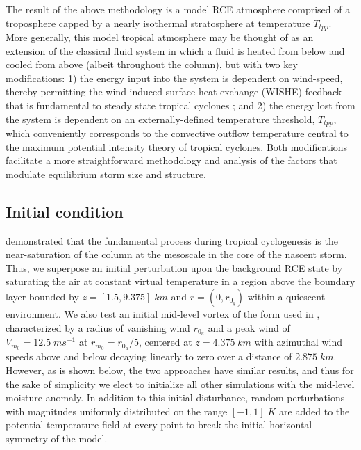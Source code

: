 \documentclass[12pt]{article}
\begin{document}
The result of the above methodology is a model RCE atmosphere comprised of a troposphere capped by a nearly isothermal stratosphere at temperature $T_{tpp}$. More generally, this model tropical atmosphere may be thought of as an extension of the classical fluid system in which a fluid is heated from below and cooled from above (albeit throughout the column), but with two key modifications: 1) the energy input into the system is dependent on wind-speed, thereby permitting the wind-induced surface heat exchange (WISHE) feedback that is fundamental to steady state tropical cyclones \citep{Emanuel_1986}; and 2) the energy lost from the system is dependent on an externally-defined temperature threshold, $T_{tpp}$, which conveniently corresponds to the convective outflow temperature central to the maximum potential intensity theory of tropical cyclones. Both modifications facilitate a more straightforward methodology and analysis of the factors that modulate equilibrium storm size and structure.

\subsection{Initial condition}
\cite{Bister_Emanuel_1997} demonstrated that the fundamental process during tropical cyclogenesis is the near-saturation of the column at the mesoscale in the core of the nascent storm. Thus, we superpose an initial perturbation upon the background RCE state by saturating the air at constant virtual temperature in a region above the boundary layer bounded by $z = [1.5, 9.375] \; km$ and $r = (0, r_{0_q})$ within a quiescent environment.  We also test an initial mid-level vortex of the form used in \cite{Rotunno_Emanuel_1987}, characterized by a radius of vanishing wind $r_{0_u}$ and a peak wind of $V_{m_0} = 12.5 \; ms^{-1}$ at $r_{m_0} = r_{0_u} / 5$, centered at $z=4.375 \; km$ with azimuthal wind speeds above and below decaying linearly to zero over a distance of $2.875 \; km$. However, as is shown below, the two approaches have similar results, and thus for the sake of simplicity we elect to initialize all other simulations with the mid-level moisture anomaly.  In addition to this initial disturbance, random perturbations with magnitudes uniformly distributed on the range $[-1,1] \; K$ are added to the potential temperature field at every point to break the initial horizontal symmetry of the model.
\end{document}

